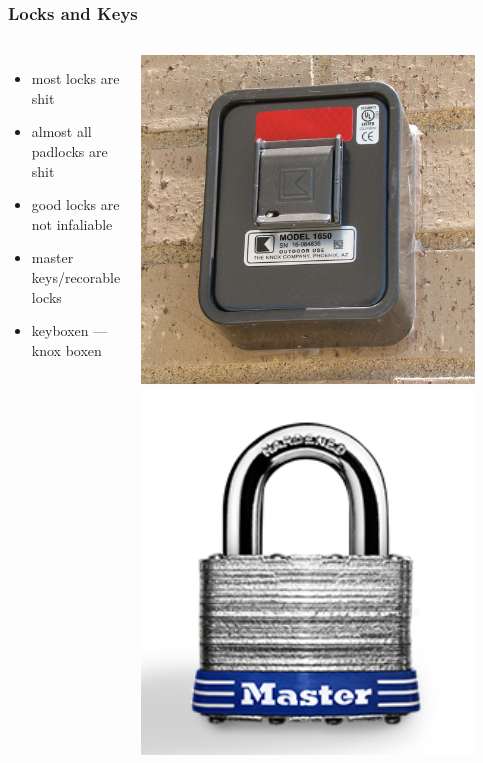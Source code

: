 \documentclass[]{beamer}
\begin{document}
\begin{frame}
  \frametitle{Locks and Keys}
  \begin{columns}[c]
    \begin{itemize}
      \item most locks are shit
      \item almost all padlocks are shit
      \item good locks are not infaliable
      \item master keys/recorable locks
      \item keyboxen --- knox boxen
    \end{itemize}
    \column{0.5\textwidty}
    \includegraphics[width=0.9\textwidth]{Knox-Box}
    \includegraphics[width=0.9\textwidth]{masterlock}

\end{columns}
\end{frame}
\end{document}
